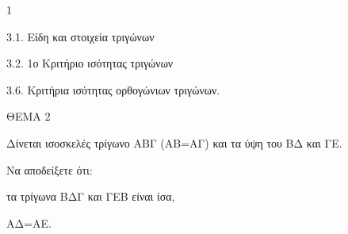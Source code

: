 \begin{ylh}{1}
    \item 3.1. Είδη και στοιχεία τριγώνων
    \item 3.2. 1ο Κριτήριο ισότητας τριγώνων
    \item 3.6. Κριτήρια ισότητας ορθογώνιων τριγώνων.
\end{ylh}

ΘΕΜΑ 2

Δίνεται ισοσκελές τρίγωνο ΑΒΓ (ΑΒ=ΑΓ) και τα ύψη του ΒΔ και ΓΕ.

Να αποδείξετε ότι:

\begin{alist}
\item τα τρίγωνα ΒΔΓ και ΓΕΒ είναι ίσα, 

\item ΑΔ=ΑΕ. 
\end{alist}
